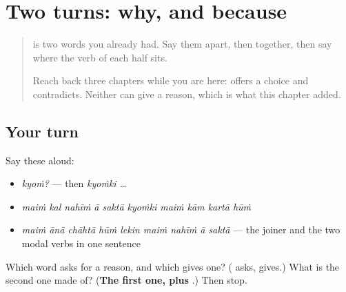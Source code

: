 \section[\texorpdfstring{\hi{क्यों}? — \hi{क्योंकि} … (kyoṁ? — kyoṁki …)}{क्यों? — क्योंकि … (kyoṁ? — kyoṁki …)}]{Two turns: why, and because}

\label{lesson:HI-R71-reasons}



\begin{quote}
\textbf{} is two words you already had. Say them apart, then together, then say where the verb of each half sits.

Reach back three chapters while you are here: \textbf{} offers a choice and \textbf{} contradicts. Neither can give a reason, which is what this chapter added.
\end{quote}

\subsection*{Your turn}
Say these aloud:

\begin{itemize}
\raggedright
  \item \emph{kyoṁ?} — then \emph{kyoṁki …}
  \item \emph{maiṁ kal nahīṁ ā saktā kyoṁki maiṁ kām kartā hūṁ}
  \item \emph{maiṁ ānā chāhtā hūṁ lekin maiṁ nahīṁ ā saktā} — the joiner and the two modal verbs in one sentence
\end{itemize}

\begin{tcolorbox}[breakable,colback=teal!4,colframe=teal!35!black,title={Before you move on}]
Which word asks for a reason, and which gives one? (\textbf{} asks, \textbf{} gives.) What is the second one made of? (\textbf{The first one, plus }.) Then stop.
\end{tcolorbox}
